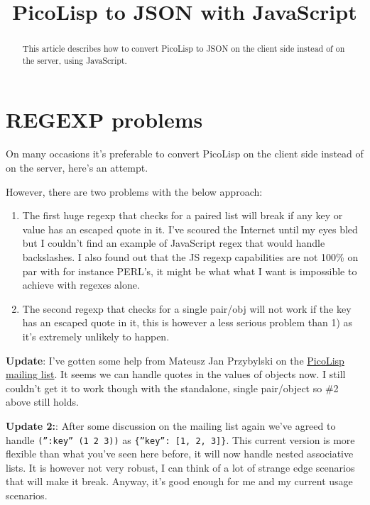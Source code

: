 \title{PicoLisp to JSON with JavaScript}

\maketitle

\begin{abstract}
  This article describes how to convert PicoLisp to JSON on the client
  side instead of on the server, using JavaScript.  
\end{abstract}

\section{REGEXP problems}
\label{sec:pl-json-jscript-regexp-problems}

On many occasions it's preferable to convert PicoLisp on the client side
instead of on the server, here's an attempt.

However, there are two problems with the below approach:

\begin{enumerate}
\item The first huge regexp that checks for a paired list will break
  if any key or value has an escaped quote in it. I've scoured the
  Internet until my eyes bled but I couldn't find an example of
  JavaScript regex that would handle backslashes. I also found out
  that the JS regexp capabilities are not 100\% on par with for
  instance PERL's, it might be what what I want is impossible to
  achieve with regexes alone.
\item The second regexp that checks for a single pair/obj will not
  work if the key has an escaped quote in it, this is however a less
  serious problem than 1) as it's extremely unlikely to happen.
\end{enumerate}

\textbf{Update}: I've gotten some help from Mateusz Jan Przybylski on the
\href{http://www.mail-archive.com/picolisp@software-lab.de/msg01050.html}{PicoLisp mailing list}. It seems we can handle quotes in the values of objects
now. I still couldn't get it to work though with the standalone, single
pair/object so \#2 above still holds.

\textbf{Update 2:}: After some discussion on the mailing list again
we've agreed to handle \texttt{(”:key” (1 2 3))} as \texttt{\{”key”:
  [1, 2, 3]\}}. This current version is more flexible than what you've
seen here before, it will now handle nested associative lists. It is
however not very robust, I can think of a lot of strange edge
scenarios that will make it break. Anyway, it's good enough for me and
my current usage scenarios.

